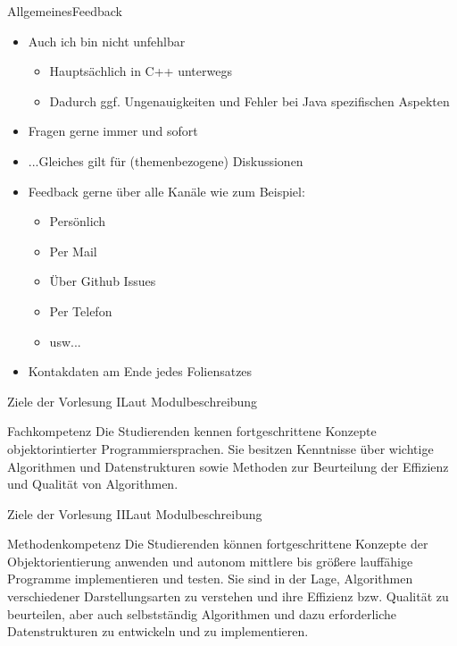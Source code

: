 \begin{frame}{Allgemeines}{Feedback}
	\begin{itemize}
		\item Auch ich bin nicht unfehlbar
		\begin{itemize}
			\item Hauptsächlich in C++ unterwegs
			\item Dadurch ggf. Ungenauigkeiten und Fehler bei Java spezifischen Aspekten
		\end{itemize}
		\item Fragen gerne immer und sofort
		\item ...Gleiches gilt für (themenbezogene) Diskussionen
		\item Feedback gerne über alle Kanäle wie zum Beispiel:
		\begin{itemize}
			\item Persönlich
			\item Per Mail
			\item Über Github Issues
			\item Per Telefon
			\item usw...
		\end{itemize}
		\item Kontakdaten am Ende jedes Foliensatzes
	\end{itemize}
\end{frame}

\begin{frame}{Ziele der Vorlesung I}{Laut Modulbeschreibung}
	\vfill
	\begin{block}{Fachkompetenz}
		Die Studierenden kennen fortgeschrittene Konzepte objektorintierter Programmiersprachen. Sie besitzen Kenntnisse über wichtige Algorithmen und Datenstrukturen sowie Methoden
		zur Beurteilung der Effizienz und Qualität von Algorithmen.
	\end{block}
	\vfill
\end{frame}

\begin{frame}{Ziele der Vorlesung II}{Laut Modulbeschreibung}
	\vfill
	\begin{block}{Methodenkompetenz}
		Die Studierenden können fortgeschrittene Konzepte der Objektorientierung anwenden und autonom mittlere bis größere lauffähige Programme implementieren und testen. Sie sind in der Lage, Algorithmen verschiedener Darstellungsarten zu 
		verstehen und ihre Effizienz bzw. Qualität zu beurteilen, aber auch selbstständig Algorithmen und dazu erforderliche Datenstrukturen zu entwickeln und zu implementieren.
	\end{block}
	\vfill
\end{frame}

